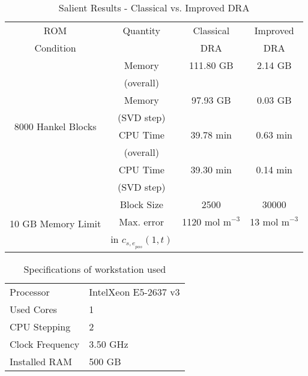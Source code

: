 \begin{table}[h]
	\singlespacing
	\centering
	\caption{Salient Results - Classical vs. Improved DRA}
	\label{table:salientresults}
	\setlength{\extrarowheight}{1pt}
	\begin{tabular}{ c c c c }
		\hline
		ROM & Quantity 		& Classical & Improved \\
		Condition		   &				  & DRA		 & DRA	  \\
		\hline
		\multirow{8}{1.22cm}{8000 Hankel Blocks}& Memory 		  & 111.80 GB	  & 2.14 GB  \\[-5pt]
		& \footnotesize (overall)		&			 & 		 \\
		& Memory 		  & 97.93 GB	  & 0.03 GB  \\[-5pt]
		& \footnotesize(SVD step)   	&			 & 		 \\
		& CPU Time 		& 39.78 min   & 0.63 min  \\[-5pt]
		& \footnotesize(overall)    	&			 & 		 \\
		& CPU Time 		& 39.30 min   & 0.14 min  \\[-5pt]
		& \footnotesize(SVD step)   	&			 & 		 \\[2.5pt]
		\hline
		\multirow{3}{1.22cm}{10 GB Memory Limit}& Block Size		  & 2500	  & 30000  \\[5pt]
		& Max. error & 1120\scriptsize $\text{ mol m}^{-\text{3}}$ &  13\scriptsize $\text{ mol m}^{-\text{3}}$ \\[-5pt]
		& in $c_{{s,e}_{pos}}$\scriptsize $(1,t)$ &  &     \\[5pt]
		\hline
	\end{tabular}
\end{table}
\newpage
\begin{table}[h]
	\caption{Specifications of workstation used}
	\label{table:comp_spec}
	\centering
	\begin{tabular}{ l l }
		\hline
		Processor & Intel\textregistered\space  Xeon \textregistered\space E5-2637 v3 \\
		Used Cores & 1 \\
		CPU Stepping & 2 \\
		Clock Frequency & 3.50 GHz \\
		Installed RAM & 500 GB \\
		\hline
	\end{tabular}
\end{table}



